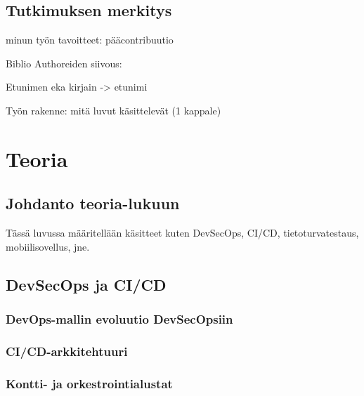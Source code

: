 \documentclass[bscthesis,finnish,oneside,biblatex]{uefcsthesis}
\begin{document}
    \section{Tutkimuksen merkitys}
    \label{sec:signigicance-of-study}

    minun työn tavoitteet: pääcontribuutio

    Biblio Authoreiden siivous:

    Etunimen eka kirjain -> etunimi

    Työn rakenne: mitä luvut käsittelevät (1 kappale)


    \chapter{Teoria}
    \label{cha:teoria}



    \section{Johdanto teoria-lukuun}
    \label{sec:teoria-johdanto}

    Tässä luvussa määritellään käsitteet kuten DevSecOps, CI/CD, tietoturvatestaus, mobiilisovellus, jne.




    \section{DevSecOps ja CI/CD}
    \label{sec:devsecops-cicd}

    \subsection{DevOps-mallin evoluutio DevSecOpsiin}

    \subsection{CI/CD-arkkitehtuuri}

    \subsection{Kontti- ja orkestrointialustat}
\end{document}
